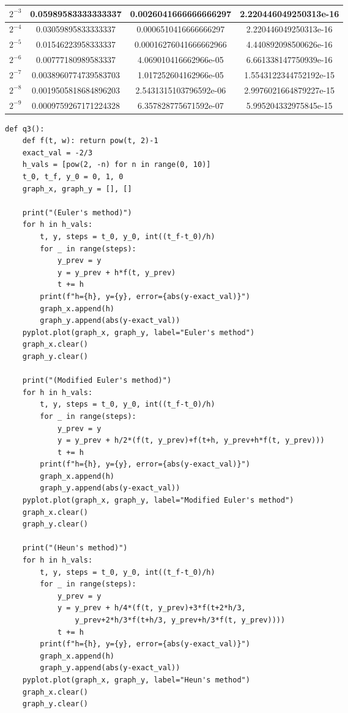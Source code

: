 \documentclass{article}
\begin{document}
\begin{itemize}
\begin{tabular}{|c|c|c|c|}
              \hline
              $2^{-3}$ & 0.05989583333333337   & 0.0026041666666666297    & 2.220446049250313e-16  \\
              \hline
              $2^{-4}$ & 0.03059895833333337   & 0.0006510416666666297    & 2.220446049250313e-16  \\
              \hline
              $2^{-5}$ & 0.01546223958333337   & 0.00016276041666662966   & 4.440892098500626e-16  \\
              \hline
              $2^{-6}$ & 0.00777180989583337   & 4.069010416662966e-05    & 6.661338147750939e-16  \\
              \hline
              $2^{-7}$ & 0.0038960774739583703 & 1.017252604162966e-05    & 1.5543122344752192e-15 \\
              \hline
              $2^{-8}$ & 0.0019505818684896203 & 2.5431315103796592e-06   & 2.9976021664879227e-15 \\
              \hline
              $2^{-9}$ & 0.0009759267171224328 & 6.357828775671592e-07    & 5.995204332975845e-15  \\
              \hline
          \end{tabular}
          \begin{verbatim}
def q3():
    def f(t, w): return pow(t, 2)-1
    exact_val = -2/3
    h_vals = [pow(2, -n) for n in range(0, 10)]
    t_0, t_f, y_0 = 0, 1, 0
    graph_x, graph_y = [], []

    print("(Euler's method)")
    for h in h_vals:
        t, y, steps = t_0, y_0, int((t_f-t_0)/h)
        for _ in range(steps):
            y_prev = y
            y = y_prev + h*f(t, y_prev)
            t += h
        print(f"h={h}, y={y}, error={abs(y-exact_val)}")
        graph_x.append(h)
        graph_y.append(abs(y-exact_val))
    pyplot.plot(graph_x, graph_y, label="Euler's method")
    graph_x.clear()
    graph_y.clear()
            
    print("(Modified Euler's method)")
    for h in h_vals:
        t, y, steps = t_0, y_0, int((t_f-t_0)/h)
        for _ in range(steps):
            y_prev = y
            y = y_prev + h/2*(f(t, y_prev)+f(t+h, y_prev+h*f(t, y_prev)))
            t += h
        print(f"h={h}, y={y}, error={abs(y-exact_val)}")
        graph_x.append(h)
        graph_y.append(abs(y-exact_val))
    pyplot.plot(graph_x, graph_y, label="Modified Euler's method")
    graph_x.clear()
    graph_y.clear()
            
    print("(Heun's method)")
    for h in h_vals:
        t, y, steps = t_0, y_0, int((t_f-t_0)/h)
        for _ in range(steps):
            y_prev = y
            y = y_prev + h/4*(f(t, y_prev)+3*f(t+2*h/3, 
                y_prev+2*h/3*f(t+h/3, y_prev+h/3*f(t, y_prev))))
            t += h
        print(f"h={h}, y={y}, error={abs(y-exact_val)}")
        graph_x.append(h)
        graph_y.append(abs(y-exact_val))
    pyplot.plot(graph_x, graph_y, label="Heun's method")
    graph_x.clear()
    graph_y.clear()
            

\end{verbatim}
\end{itemize}
\end{document}
